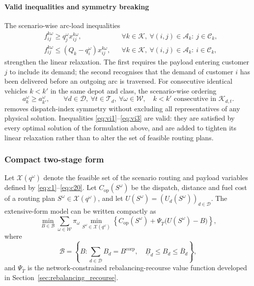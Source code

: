 \documentclass[authoryear,final,3p,times]{elsarticle}
\theoremstyle{definition}
\theoremstyle{plain}
\begin{document}
\paragraph{Valid inequalities and symmetry breaking}
\label{subsec:strengthening}

The scenario-wise arc-load inequalities
\begin{align}
&f_{ij}^{k\omega}\ge q_j^\omega x_{ij}^{k\omega},
&&\forall k\in\mathcal K,\ \forall(i,j)\in\mathcal A_k:\ j\in\mathcal C_k,
\label{eq:vi1}\\
&f_{ij}^{k\omega}\le(Q_k-q_i^\omega)x_{ij}^{k\omega},
&&\forall k\in\mathcal K,\ \forall(i,j)\in\mathcal A_k:\ i\in\mathcal C_k,
\label{eq:vi2}
\end{align}
strengthen the linear relaxation.  The first requires the payload entering
customer $j$ to include its demand; the second recognises that the demand of
customer $i$ has been delivered before an outgoing arc is traversed.  For
consecutive identical vehicles $k<k'$ in the same depot and class, the
scenario-wise ordering
\begin{equation}
a_k^\omega\ge a_{k'}^\omega,
\qquad
\forall d\in\mathcal D,\ \forall t\in\mathcal T_d,\ \forall\omega\in\mathcal W,
\quad k<k'\text{ consecutive in }\mathcal K_{d,t}.
\label{eq:vi3}
\end{equation}
removes dispatch-index symmetry without excluding all representatives of any
physical solution.  Inequalities \eqref{eq:vi1}--\eqref{eq:vi3} are valid:
they are satisfied by every optimal solution of the formulation above, and
are added to tighten its linear relaxation rather than to alter the set of
feasible routing plans.

\subsubsection{Compact two-stage form}
\label{subsec:model_interpretation}

Let $\mathcal X(q^\omega)$ denote the feasible set of the scenario routing and
payload variables defined by \eqref{eq:c1}--\eqref{eq:c20}.  Let
$C_{\mathrm{op}}(S^\omega)$ be the dispatch, distance and fuel cost of a routing plan
$S^\omega\in\mathcal X(q^\omega)$, and let
$U(S^\omega)=(U_d(S^\omega))_{d\in\mathcal D}$.  The extensive-form model can
be written compactly as
\begin{equation}
\min_{B\in\mathcal B}
\sum_{\omega\in\mathcal W}\pi_\omega
\min_{S^\omega\in\mathcal X(q^\omega)}
\left\{
C_{\mathrm{op}}(S^\omega)
+\Psi_{\overline T}\bigl(U(S^\omega)-B\bigr)
\right\},
\label{eq:two_stage_value_form}
\end{equation}
where
\begin{equation*}
\mathcal B=\left\{B:
\sum_{d\in\mathcal D}B_d=B^{\mathrm{corp}},\quad
\underline B_d\le B_d\le\overline B_d\right\},
\end{equation*}
and $\Psi_{\overline T}$ is the network-constrained rebalancing-recourse value
function developed in Section~\ref{sec:rebalancing_recourse}.
\end{document}
